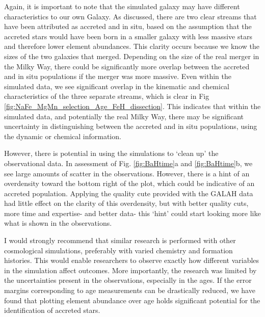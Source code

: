 \documentclass[fleqn,usenatbib]{mnras}
\begin{document}
Again, it is important to note that the simulated galaxy may have different characteristics to our own Galaxy. As discussed, there are two clear streams that have been attributed as accreted and in situ, based on the assumption that the accreted stars would have been born in a smaller galaxy with less massive stars and therefore lower element abundances. This clarity occurs because we know the sizes of the two galaxies that merged. Depending on the size of the real merger in the Milky Way, there could be significantly more overlap between the accreted and in situ populations if the merger was more massive. Even within the simulated data, we see significant overlap in the kinematic and chemical characteristics of the three separate streams, which is clear in Fig \ref{fig:NaFe_MgMn_selection_Age_FeH_dissection}. This indicates that within the simulated data, and potentially the real Milky Way, there may be significant uncertainty in distinguishing between the accreted and in situ populations, using the dynamic or chemical information. \par 
However, there is potential in using the simulations to ‘clean up’ the observational data. In assessment of Fig. \ref{fig:BaHtime}a and \ref{fig:BaHtime}b, we see large amounts of scatter in the observations. However, there is a hint of an overdensity toward the bottom right of the plot, which could be indicative of an accreted population. Applying the quality cute provided with the GALAH data had little effect on the clarity of this overdensity, but with better quality cuts, more time and expertise- and better data- this ‘hint’ could start looking more like what is shown in the observations.\par 
I would strongly recommend that similar research is performed with other cosmological simulations, preferably with varied chemistry and formation histories. This would enable researchers to observe exactly how different variables in the simulation affect outcomes. More importantly, the research was limited by the uncertainties present in the observations, especially in the ages. If the error margins corresponding to age measurements can be drastically reduced, we have found that plotting element abundance over age holds significant potential for the identification of accreted stars. \par 
\end{document}
